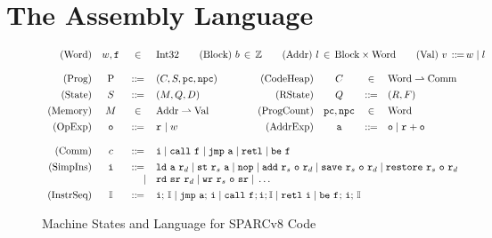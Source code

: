 \section{The \sparc{} Assembly Language}
\label{sec:modeling}

\begin{figure}[!t]
	\centering
	\small
	\[
		\begin{array}{rcclcrccl}
			\TYPE{(Word)} & \word, \lab{} & \in & 
			\multicolumn{6}{l}
			{ 
				\TYPE{Int32} \qquad
				\TYPE{(Block)} \ \block \, \in \, \Ztype 
				\qquad
				\TYPE{(Addr)} \ \loc \, \in \,  
					\TYPE{Block} \times \TYPE{Word}
				\qquad
				\TYPE{(Val)} \ \val \,
					\define \, \word \sepline \loc
			}
			\\
			\\
			\TYPE{(Prog)} & \prog & \define & 
				(\code, \state, \pc, \npc) & \qquad & 
			\TYPE{(CodeHeap)} & \ \code \ & \in &  
				\TYPE{Word} \rightharpoonup \TYPE{Comm}
			\\
			\\[-8pt]
			\TYPE{(State)} & \state & \define & 
				(\mem, \Rstate, \DBuf) & & 
			\TYPE{(RState)} & \Rstate & \define & 
				(\RFile, \Wstack) 
			\\
			\\[-8pt]
			\TYPE{(Memory)} & \mem & \in & 
				\TYPE{Addr} \rightharpoonup \TYPE{Val} 
			& & 
			\TYPE{(ProgCount)} & \pc, \npc & \in & \TYPE{Word}
			\\
			\\[-8pt]
			\TYPE{(OpExp)} & \oexp & \define & 
				\reg{} \sepline \word & & 
			\TYPE{(AddrExp)} & \aexp & \define & 
				\oexp \sepline \reg{} + \oexp \\
			\\
			\TYPE{(Comm)} & \comm & \define & 
			\multicolumn{6}{l}
			{
				\simplins{} \sepline \call{} \ \lab{}
				\sepline \jmp{} \ \aexp \sepline \retl{} \sepline
				\be \ \lab{} 
			} \\
			\\[-8pt]
			\TYPE{(SimpIns)} & \simplins{} & \define & 
			\multicolumn{6}{l}
			{
				\ld{} \ \aexp \ \reg{d} \sepline 
				\st{} \ \reg{s} \ \aexp \sepline
				\nop{} \sepline  
				\cadd{} \ \reg{s} \ \oexp \ \reg{d} \sepline
				\csave{} \ \reg{s} \ \oexp \ \reg{d} \sepline 
				\crestore{} \ \reg{s} \ \oexp \ \reg{d}
			} \\
			& & \ \ \ \ | & 
			\multicolumn{6}{l}
			{
				\rd{} \ \sr \ \reg{d} \sepline 
				\cwr{} \ \reg{s} \ \oexp \ \sr \sepline
				\dots
			} \\ 
			\\[-8pt]
			\TYPE{(InstrSeq)} & \cblk & \define & 
			\multicolumn{6}{l}
			{
				\simplins{}; \, \cblk \sepline 
				\jmp{} \ \aexp; \, \simplins{} \sepline 
				\call{} \ \lab{}; \simplins{}; \cblk \sepline 
				\retl{} \ \simplins{} \sepline 
				\be{} \ \lab{}; \, \simplins{}; \, \cblk
			}
		\end{array}
	\]
	\vspace*{-0.5em}
	\caption{Machine States and Language for SPARCv8 Code}
	\label {fig:Machine States and Language for SPARC Code}
	\vspace*{-0.5em}
\end{figure}

